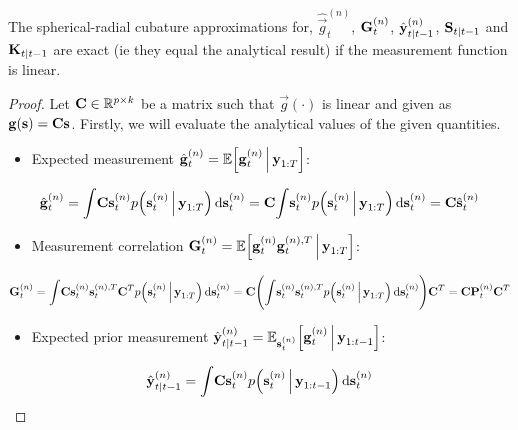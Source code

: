 		\begin{theorem}
			The spherical-radial cubature approximations for, \( \hat{\vec{g}}_t^{(n)} \), \( \boldsymbol{\mathrm{G}}_t^{(n)} \), \( \hat{\boldsymbol{\mathrm{y}}}_{t \vert t - 1}^{(n)} \), \( \boldsymbol{\mathrm{S}}_{t \vert t - 1} \) and \( \boldsymbol{\mathrm{K}}_{t \vert t - 1} \) are exact (\ac{ie} they equal the analytical result) if the measurement function is linear.
		\end{theorem}
		\begin{proof}
			Let \( \boldsymbol{\mathrm{C}} \in \mathbb{R}^{p \times k} \) be a matrix such that \( \vec{g}(\cdot) \) is linear and given as \( \boldsymbol{\mathrm{g}}(\boldsymbol{\mathrm{s}}) = \boldsymbol{\mathrm{C}} \boldsymbol{\mathrm{s}} \). Firstly, we will evaluate the analytical values of the given quantities.
			\begin{itemize}
				\item Expected measurement \( \hat{\boldsymbol{\mathrm{g}}}_t^{(n)} = \mathbb{E}\Big[\boldsymbol{\mathrm{g}}_t^{(n)} \,\Big\vert\, \boldsymbol{\mathrm{y}}_{1:T}\Big] \):
			\end{itemize}
			\begin{align*}
				\hat{\boldsymbol{\mathrm{g}}}_t^{(n)}
					= \int\! \boldsymbol{\mathrm{C}} \boldsymbol{\mathrm{s}}_t^{(n)} p\Big( \boldsymbol{\mathrm{s}}_t^{(n)} \,\Big\vert\, \boldsymbol{\mathrm{y}}_{1:T} \Big) \dd{\boldsymbol{\mathrm{s}}_t^{(n)}}
					= \boldsymbol{\mathrm{C}} \! \int\! \boldsymbol{\mathrm{s}}_t^{(n)} p\Big( \boldsymbol{\mathrm{s}}_t^{(n)} \,\Big\vert\, \boldsymbol{\mathrm{y}}_{1:T} \Big) \dd{\boldsymbol{\mathrm{s}}_t^{(n)}}
					= \boldsymbol{\mathrm{C}} \hat{\boldsymbol{\mathrm{s}}}_{t}^{(n)}
			\end{align*}
			\begin{itemize}
				\item Measurement correlation \( \boldsymbol{\mathrm{G}}_t^{(n)} = \mathbb{E}\Big[\boldsymbol{\mathrm{g}}_t^{(n)} \boldsymbol{\mathrm{g}}_t^{(n), T} \,\Big\vert\, \boldsymbol{\mathrm{y}}_{1:T}\Big] \):
			\end{itemize}
			\begin{align*}
				\boldsymbol{\mathrm{G}}_t^{(n)}
					= \int\! \boldsymbol{\mathrm{C}} \boldsymbol{\mathrm{s}}_t^{(n)} \boldsymbol{\mathrm{s}}_t^{(n), T} \boldsymbol{\mathrm{C}}^T p\Big( \boldsymbol{\mathrm{s}}_t^{(n)} \,\Big\vert\, \boldsymbol{\mathrm{y}}_{1:T} \Big) \dd{\boldsymbol{\mathrm{s}}_t^{(n)}}
					= \boldsymbol{\mathrm{C}} \Bigg(\! \int\! \boldsymbol{\mathrm{s}}_t^{(n)} \boldsymbol{\mathrm{s}}_t^{(n), T} p\Big( \boldsymbol{\mathrm{s}}_t^{(n)} \,\Big\vert\, \boldsymbol{\mathrm{y}}_{1:T} \Big) \dd{\boldsymbol{\mathrm{s}}_t^{(n)}} \!\Bigg) \boldsymbol{\mathrm{C}}^T
					= \boldsymbol{\mathrm{C}} \boldsymbol{\mathrm{P}}_t^{(n)} \boldsymbol{\mathrm{C}}^T
			\end{align*}
			\begin{itemize}
				\item Expected prior measurement \( \hat{\boldsymbol{\mathrm{y}}}_{t \vert t - 1}^{(n)} = \mathbb{E}_{\boldsymbol{\mathrm{s}}_t^{(n)}}\Big[\boldsymbol{\mathrm{g}}_t^{(n)} \,\Big\vert\, \boldsymbol{\mathrm{y}}_{1:t - 1}\Big] \):
			\end{itemize}
			\begin{align*}
				\hat{\vec{y}}_{t \subgiven t - 1}^{(n)}
					= \int\! \mat{C} \vec{s}_t^{(n)} p\Big(\vec{s}_t^{(n)} \Biggiven \vec{y}_{1:t - 1}\Big) \dd{\vec{s}_t^{(n)}}

\end{align*}
\end{proof}
